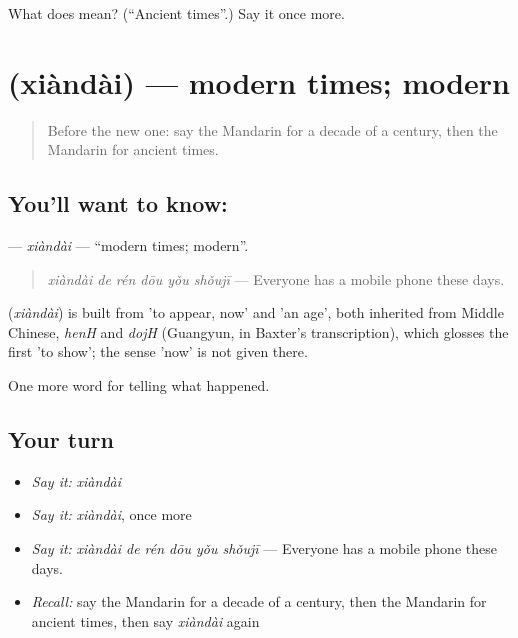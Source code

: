 \begin{tcolorbox}[breakable,colback=teal!4,colframe=teal!35!black,title={Before you move on}]
What does  mean? (\textquotedblleft{}Ancient times\textquotedblright{}.) Say it once more.
\end{tcolorbox}
\section[\texorpdfstring{\zh{现代} (xiàndài)}{现代 (xiàndài)}]{ (xiàndài) — modern times; modern}

\label{lesson:ZH-C323-xiandai}



\begin{quote}
Before the new one: say the Mandarin for a decade of a century, then the Mandarin for ancient times.
\end{quote}

\subsection*{You'll want to know: }
\textbf{} — \emph{xiàndài} — \textquotedblleft{}modern times; modern\textquotedblright{}.

\begin{quote}
\textbf{} \emph{xiàndài de rén dōu yǒu shǒujī} — Everyone has a mobile phone these days.
\end{quote}

\begin{cousinweb}
\textbf{} (\emph{xiàndài}) is built from  'to appear, now' and  'an age', both inherited from Middle Chinese, \emph{henH} and \emph{dojH} (Guangyun, in Baxter's transcription), which glosses the first 'to show'; the sense 'now' is not given there.
\end{cousinweb}

\begin{grammarlens}[title={What you've built}]
One more word for telling what happened.
\end{grammarlens}

\subsection*{Your turn}
\begin{itemize}
\raggedright
  \item \emph{Say it:} \emph{xiàndài}
  \item \emph{Say it:} \emph{xiàndài}, once more
  \item \emph{Say it:} \emph{xiàndài de rén dōu yǒu shǒujī} — Everyone has a mobile phone these days.
  \item \emph{Recall:} say the Mandarin for a decade of a century, then the Mandarin for ancient times, then say \emph{xiàndài} again
\end{itemize}

